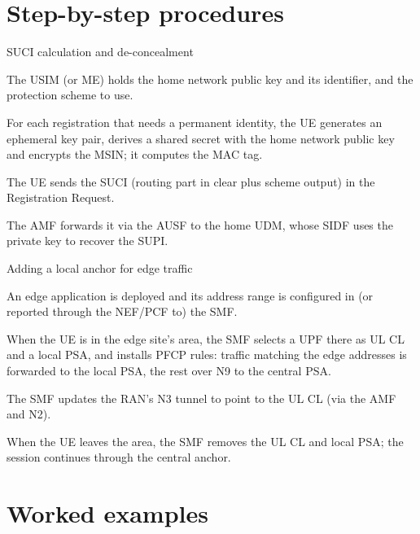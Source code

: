 \documentclass[11pt,a4paper]{article}
\begin{document}
\section{Step-by-step procedures}

\begin{procedurebox}{SUCI calculation and de-concealment}\label{proc:suci}
\begin{steps}
  \item The USIM (or ME) holds the home network public key and its identifier, and the protection scheme to use.
  \item For each registration that needs a permanent identity, the UE generates an ephemeral key pair, derives a shared secret
        with the home network public key and encrypts the MSIN; it computes the MAC tag.
  \item The UE sends the SUCI (routing part in clear plus scheme output) in the Registration Request.
  \item The AMF forwards it via the AUSF to the home UDM, whose SIDF uses the private key to recover the SUPI.
\end{steps}
\end{procedurebox}

\begin{procedurebox}{Adding a local anchor for edge traffic}\label{proc:ulcl}
\begin{steps}
  \item An edge application is deployed and its address range is configured in (or reported through the NEF/PCF to) the SMF.
  \item When the UE is in the edge site's area, the SMF selects a UPF there as UL CL and a local PSA, and installs PFCP rules: traffic
        matching the edge addresses is forwarded to the local PSA, the rest over N9 to the central PSA.
  \item The SMF updates the RAN's N3 tunnel to point to the UL CL (via the AMF and N2).
  \item When the UE leaves the area, the SMF removes the UL CL and local PSA; the session continues through the central anchor.
\end{steps}
\end{procedurebox}

\section{Worked examples}
\end{document}
